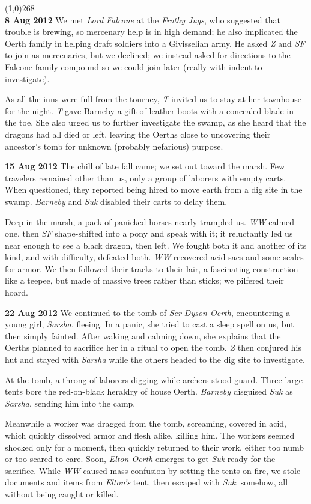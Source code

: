 \documentclass[letterpaper]{article}
\newcommand{\colline}{\noindent\line(1,0){268} \\}
\newcommand{\e}[1]{\emph{#1}}
\newcommand{\B}[1]{\textbf{#1}}
\newenvironment{notesection}[1]
{\noindent {\huge \B{#1}} \par
\vspace{-0.75em}
\colline
\begingroup\fontsize{9pt}{12pt}\selectfont}
{\endgroup}
\begin{document}
\begin{notesection}{Events}
\B{8 Aug 2012} We met \e{Lord Falcone} at the \e{Frothy Jugs}, who suggested that trouble is brewing, so mercenary help is in high demand; he also implicated the Oerth family in helping draft soldiers into a Givisselian army.  He asked \e{Z} and \e{SF} to join as mercenaries, but we declined; we instead asked for directions to the Falcone family compound so we could join later (really with indent to investigate).

As all the inns were full from the tourney, \e{T} invited us to stay at her townhouse for the night. \e{T} gave Barneby a gift of leather boots with a concealed blade in the toe. She also urged us to further investigate the swamp, as she heard that the dragons had all died or left, leaving the Oerths close to uncovering their ancestor's tomb for unknown (probably nefarious) purpose.

\B{15 Aug 2012} The chill of late fall came; we set out toward the marsh. Few travelers remained other than us, only a group of laborers with empty carts. When questioned, they reported being hired to move earth from a dig site in the swamp.  \e{Barneby} and \e{Suk} disabled their carts to delay them.

Deep in the marsh, a pack of panicked horses nearly trampled us.  \e{WW} calmed one, then \e{SF} shape-shifted into a pony and speak with it; it reluctantly led us near enough to see a black dragon, then left. We fought both it and another of its kind, and with difficulty, defeated both. \e{WW} recovered acid sacs and some scales for armor. We then followed their tracks to their lair, a fascinating construction like a teepee, but made of massive trees rather than sticks; we pilfered their hoard.

\B{22 Aug 2012} We continued to the tomb of \e{Ser Dyson Oerth}, encountering a young girl, \e{Sarsha}, fleeing. In a panic, she tried to cast a sleep spell on us, but then simply fainted. After waking and calming down, she explains that the Oerths planned to sacrifice her in a ritual to open the tomb. \e{Z} then conjured his hut and stayed with \e{Sarsha} while the others headed to the dig site to investigate.

At the tomb, a throng of laborers digging while archers stood guard. Three large tents bore the red-on-black heraldry of house Oerth. \e{Barneby} disguised \e{Suk} as \e{Sarsha}, sending him into the camp.

Meanwhile a worker was dragged from the tomb, screaming, covered in acid, which quickly dissolved armor and flesh alike, killing him. The workers seemed shocked only for a moment, then quickly returned to their work, either too numb or too scared to care. Soon, \e{Elton Oerth} emerges to get \e{Suk} ready for the sacrifice. While \e{WW} caused mass confusion by setting the tents on fire, we stole documents and items from \e{Elton's} tent, then escaped with \e{Suk}; somehow, all without being caught or killed.


\end{notesection}
\end{document}

